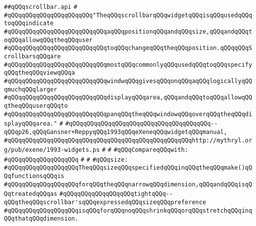 \label{src/lib/x-kit/widget/old/leaf/scrollbar.api}
\verb|##qQQqscrollbar.api|\newline
\verb|#|\newline
\verb|#qQQqqQQqqQQqqQQqqQQqqQQq"TheqQQqscrollbarqQQqwidgetqQQqisqQQqusedqQQqtoqQQqindicate|\newline
\verb|#qQQqqQQqqQQqqQQqqQQqqQQqqQQqaqQQqpositionqQQqandqQQqsize,qQQqandqQQqtoqQQqallowqQQqtheqQQquser|\newline
\verb|#qQQqqQQqqQQqqQQqqQQqqQQqqQQqtoqQQqchangeqQQqtheqQQqposition.qQQqqQQqScrollbarsqQQqare|\newline
\verb|#qQQqqQQqqQQqqQQqqQQqqQQqqQQqmostqQQqcommonlyqQQqusedqQQqtoqQQqspecifyqQQqtheqQQqviewqQQqa|\newline
\verb|#qQQqqQQqqQQqqQQqqQQqqQQqqQQqwindwqQQqgivesqQQqonqQQqaqQQqlogicallyqQQqmuchqQQqlarger|\newline
\verb|#qQQqqQQqqQQqqQQqqQQqqQQqqQQqdisplayqQQqarea,qQQqandqQQqtoqQQqallowqQQqtheqQQquserqQQqto|\newline
\verb|#qQQqqQQqqQQqqQQqqQQqqQQqqQQqpanqQQqtheqQQqwindowqQQqoverqQQqtheqQQqdisplayqQQqarea."|\newline
\verb|#|\newline
\verb|#qQQqqQQqqQQqqQQqqQQqqQQqqQQqqQQqqQQqqQQq--qQQqp26,qQQqGansner+ReppyqQQq1993qQQqeXeneqQQqwidgetqQQqmanual,|\newline
\verb|#qQQqqQQqqQQqqQQqqQQqqQQqqQQqqQQqqQQqqQQqqQQqqQQqqQQqhttp://mythryl.org/pub/exene/1993-widgets.ps|\newline
\verb|#|\newline
\verb|#|\newline
\verb|#qQQqCompareqQQqwith:|\newline
\verb|#qQQqqQQqqQQqqQQqqQQq|\newline
\verb|#|\newline
\verb|#|\newline
\verb|#qQQqsize:|\newline
\verb|#qQQqqQQqqQQqqQQqqQQqTheqQQqsizeqQQqspecifiedqQQqinqQQqtheqQQqmake()qQQqfunctionsqQQqis|\newline
\verb|#qQQqqQQqqQQqqQQqqQQqforqQQqtheqQQqnarrowqQQqdimension,qQQqandqQQqisqQQqtreatedqQQqas|\newline
\verb|#qQQqqQQqqQQqqQQqqQQqtightqQQq--qQQqtheqQQqscrollbar'sqQQqexpressedqQQqsizeqQQqpreference|\newline
\verb|#qQQqqQQqqQQqqQQqqQQqisqQQqforqQQqnoqQQqshrinkqQQqorqQQqstretchqQQqinqQQqthatqQQqdimension.|\newline
